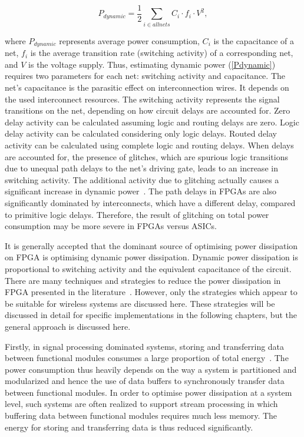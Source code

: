 \begin{center}
\begin{equation}
\label{Pdynamic}
 P_{\mathit{dynamic}} =\frac{1}{2} \sum\limits_{i \in \mathit{all nets}} C_{i} \cdot f_{i} \cdot V^2,
\end{equation}
\end{center}
where $P_{\mathit{dynamic}}$ represents average power consumption, $C_{i}$ is the capacitance of a net, $f_{i}$ is the average transition rate (switching activity) of a corresponding net, and $V$ is the voltage supply.
Thus, estimating dynamic power (\ref{Pdynamic}) requires two parameters for each net: switching activity and capacitance.
The net's capacitance is the parasitic effect on interconnection wires. It depends on the used interconnect resources.
The switching activity represents the signal transitions on the net, depending on how circuit delays are accounted for.
Zero delay activity can be calculated assuming logic and routing delays are zero. Logic delay activity can be calculated considering only logic delays.
Routed delay activity can be calculated using complete logic and routing delays.
When delays are accounted for, the presence of glitches, which are spurious logic transitions due to unequal path delays to the net’s driving gate, leads to an increase in switching activity.
The additional activity due to glitching actually causes a significant increase in dynamic power~\cite{Anderson2004a}.
The path delays in FPGAs are also significantly dominated by interconnects, which have a different delay, compared to primitive logic delays. Therefore, the result of glitching on total power consumption may be more severe in FPGAs versus ASICs.

It is generally accepted that the dominant source of optimising power dissipation on FPGA is optimising dynamic power dissipation.
Dynamic power dissipation is proportional to switching activity and the equivalent capacitance of the circuit.
There are many techniques and strategies to reduce the power dissipation in FPGA presented in the literature~\cite{Danckaert1999,Kovacs2000,Czapski2007,Liu2009,Ahuja2010}.
However, only the strategies which appear to be suitable for wireless systems are discussed here.
These strategies will be discussed in detail for specific implementations in the following chapters, but the general approach is discussed here.

Firstly, in signal processing dominated systems, storing and transferring data between functional modules consumes a large proportion of total energy~\cite{Liu2009}.
The power consumption thus heavily depends on the way a system is partitioned and modularized and hence the use of data buffers to synchronously transfer data between functional modules.
In order to optimise power dissipation at a system level, such systems are often realized to support stream processing in which buffering data between functional modules requires much less memory.
The energy for storing and transferring data is thus reduced significantly.

